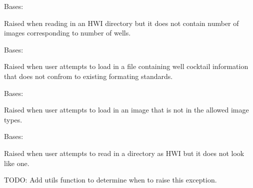 \documentclass[letterpaper,10pt,english]{sphinxmanual}
\begin{document}

\begin{fulllineitems}
\label{\detokenize{polo.utils:polo.utils.exceptions.IncompletePlateError}}
Bases: 

Raised when reading in an HWI directory but it does not contain number
of images corresponding to number of wells.

\end{fulllineitems}


\begin{fulllineitems}
\label{\detokenize{polo.utils:polo.utils.exceptions.InvalidCocktailFile}}
Bases: 

Raised when user attempts to load in a file containing well cocktail
information that does not confrom to existing formating standards.

\end{fulllineitems}


\begin{fulllineitems}
\label{\detokenize{polo.utils:polo.utils.exceptions.NotASolutionError}}
Bases: 

Raised when user attempts to load in an image that is not in the allowed
image types.

\end{fulllineitems}


\begin{fulllineitems}
\label{\detokenize{polo.utils:polo.utils.exceptions.NotHWIDirectoryError}}
Bases: 

Raised when user attempts to read in a directory as HWI but it does
not look like one.

TODO: Add utils function to determine when to raise this exception.

\end{fulllineitems}
\end{document}
